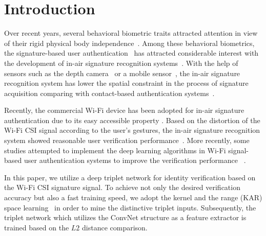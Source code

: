 \documentclass{sig-alternate-05-2015}
\begin{document}
%
%

%
%
\printccsdesc



\section{Introduction}
Over recent years, several behavioral biometric traits attracted attention in view of their rigid physical body independence~\cite{bailador2011analysis}. Among these behavioral biometrics, the signature-based user authentication~\cite{fahmy2010online,sanmorino2012survey,galbally2015line} has attracted considerable interest with the development of in-air signature recognition systems~\cite{jeon2012system,malik20183dairsig,ketabdar2012magnetic}.
With the help of sensors such as the depth camera~\cite{jeon2012system,malik20183dairsig} or a mobile sensor~\cite{ketabdar2012magnetic}, the in-air signature recognition system has lower the spatial constraint in the process of signature acquisition comparing with contact-based authentication systems~\cite{jeon2012system,malik20183dairsig,ketabdar2012magnetic,sesa2012information}.

Recently, the commercial Wi-Fi device has been adopted for in-air signature authentication due to its easy accessible property \cite{moon2017air}. Based on the distortion of the  Wi-Fi CSI signal according to the user's gestures, the in-air signature recognition system showed reasonable user verification performance~\cite{moon2017air}. More recently, some studies attempted to implement the deep learning algorithms in Wi-Fi signal-based user authentication systems to improve the verification performance ~\cite{shi2017smart,pokkunuru2018neuralwave}. 

In this paper, we utilize a deep triplet network for identity verification based on the Wi-Fi CSI signature signal. To achieve not only the desired verification accuracy but also a fast training speed, we adopt the kernel and the range (KAR) space learning~\cite{toh100,toh2018learning,toh2018analytic,toh2018gradient} in order to mine the distinctive triplet inputs. Subsequently, the triplet network which utilizes the ConvNet structure as a feature extractor is trained based on the $L2$ distance comparison.
\end{document}
